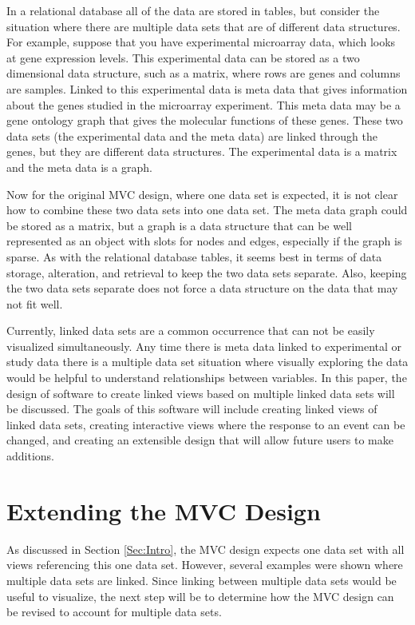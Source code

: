 \documentclass{article}[11pt]
\begin{document}
In a relational database all of the data are stored in tables, but consider the
situation where there are multiple data sets that are of different data
structures.  For example, suppose that you have experimental microarray data,
which looks at gene expression levels.  This experimental data can be
stored as a two dimensional data structure, such as a matrix, where rows are
genes and columns are samples.  Linked to this
experimental data is meta data that gives information about the genes studied
in the microarray experiment.  This meta data may be a gene ontology
graph that gives the molecular functions of these genes.  These two data sets
(the experimental data and the meta data) are linked through the genes, but
they are different data structures.  The experimental data is a matrix and
the meta data is a graph.  

Now for the original MVC design, where one data set is expected, it is not
clear how to combine these two data sets into one data set.  The meta data
graph could be stored as a matrix, but a graph is a data structure that can be
well represented as an object with slots for nodes and edges, especially if
the graph is sparse.  As with the relational database tables, it seems
best in terms of data storage, alteration, and retrieval to keep the two data
sets separate.  Also, keeping the two data sets separate does not force a data
structure on the data that may not fit well.  

Currently, linked data sets are a common occurrence that can not be easily
visualized simultaneously.  Any time there is meta data linked to experimental
or study data there is a multiple data set situation where visually exploring
the data would be helpful to understand relationships between variables.  In
this paper, the design of software to create linked views based on multiple
linked data sets will be discussed.  The goals of this software will include
creating linked views of linked data sets, creating interactive
views where the response to an event can be changed, and creating
an extensible design that will allow future users to make additions.

\section{Extending the MVC Design}\label{Sec:Extend}

As discussed in Section \ref{Sec:Intro}, the MVC design expects one data set
with all views referencing this one data set.  However, several examples were
shown where multiple data sets are linked.  Since linking between multiple
data sets would be useful to visualize, the next step will be to determine how
the MVC design can be revised to account for multiple data sets.  
\end{document}
